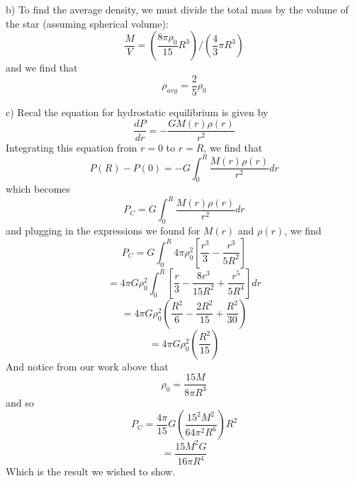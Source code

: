 \documentclass{article}
\begin{document}
b) To find the average density, we must divide the total mass by the volume of the star (assuming spherical volume):
\[\frac{M}{V} = \left(\frac{8\pi \rho_0}{15}R^3\right)/\left(\frac{4}{3}\pi R^3\right)\]
and we find that
\[\rho_{avg} = \frac{2}{5}\rho_0\]

c) Recal the equation for hydrostatic equilibrium is given by
\[\frac{dP}{dr} = -\frac{GM(r)\rho(r)}{r^2}\]
Integrating this equation from $r = 0$ to $r = R$, we find that
\[P(R) - P(0) = -G\int_0^R \frac{M(r)\rho(r)}{r^2}dr\]
which becomes
\[P_C = G \int_0^R \frac{M(r)\rho(r)}{r^2}dr\]
and plugging in the expressions we found for $M(r)$ and $\rho(r)$, we find
\[P_C = G\int_0^R 4\pi \rho_0^2\left[\frac{r^3}{3} - \frac{r^3}{5R^2}\right]\]
\[ = 4\pi G\rho_0^2 \int_0^R\left[\frac{r}{3} - \frac{8r^3}{15R^2} + \frac{r^5}{5R^4}\right]dr\]
\[ = 4\pi G\rho_0^2\left(\frac{R^2}{6} - \frac{2R^2}{15} + \frac{R^2}{30}\right)\]
\[ = 4\pi G \rho_0^2\left(\frac{R^2}{15}\right)\]
And notice from our work above that 
\[\rho_0 = \frac{15M}{8\pi R^3}\]
and so
\[P_C = \frac{4\pi}{15}G\left(\frac{15^2M^2}{64 \pi^2R^6}\right)R^2\]
\[ = \frac{15 M^2G}{16 \pi R^4}\]
Which is the result we wished to show.
\end{document}
